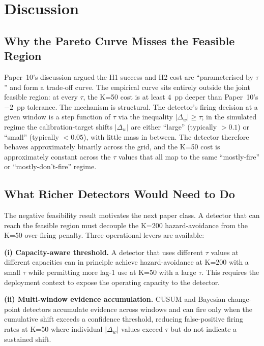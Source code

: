 \section{Discussion}

\subsection{Why the Pareto Curve Misses the Feasible Region}

Paper~10's discussion argued the H1 success and H2 cost are
``parameterised by $\tau$'' and form a trade-off curve. The empirical
curve sits entirely outside the joint feasible region: at every
$\tau$, the K=50 cost is at least $4$~pp deeper than Paper~10's
$-2$~pp tolerance. The mechanism is structural. The detector's
firing decision at a given window is a step function of $\tau$ via
the inequality $|\Delta_w| \geq \tau$; in the simulated regime the
calibration-target shifts $|\Delta_w|$ are either ``large''
(typically $> 0.1$) or ``small'' (typically $< 0.05$), with little
mass in between. The detector therefore behaves approximately
binarily across the grid, and the K=50 cost is approximately
constant across the $\tau$ values that all map to the same
``mostly-fire'' or ``mostly-don't-fire'' regime.

\subsection{What Richer Detectors Would Need to Do}

The negative feasibility result motivates the next paper class. A
detector that can reach the feasible region must decouple the K=200
hazard-avoidance from the K=50 over-firing penalty. Three operational
levers are available:

\textbf{(i) Capacity-aware threshold.} A detector that uses different
$\tau$ values at different capacities can in principle achieve
hazard-avoidance at K=200 with a small $\tau$ while permitting more
lag-1 use at K=50 with a large $\tau$. This requires the deployment
context to expose the operating capacity to the detector.

\textbf{(ii) Multi-window evidence accumulation.} CUSUM and Bayesian
change-point detectors accumulate evidence across windows and can
fire only when the cumulative shift exceeds a confidence threshold,
reducing false-positive firing rates at K=50 where individual
$|\Delta_w|$ values exceed $\tau$ but do not indicate a sustained
shift.

